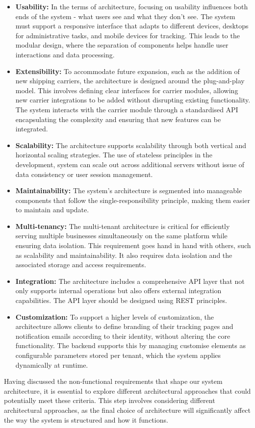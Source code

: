 \begin{itemize}
    \item \textbf{Usability:} In the terms of architecture, focusing on usability influences both ends of the system - what users see and what they don't see.
    The system must support a responsive interface that adapts to different devices, desktops for administrative tasks, and mobile devices for tracking.
    This leads to the modular design, where the separation of components helps handle user interactions and data processing.
    \item \textbf{Extensibility:} To accommodate future expansion, such as the addition of new shipping carriers, the architecture is designed around the plug-and-play model.
    This involves defining clear interfaces for carrier modules, allowing new carrier integrations to be added without disrupting existing functionality.
    The system interacts with the carrier module through a standardised API encapsulating the complexity and ensuring that new features can be integrated.
    \item \textbf{Scalability:} The architecture supports scalability through both vertical and horizontal scaling strategies.
    The use of stateless principles in the development, system can scale out across additional servers without issue of data consistency or user session management.
    \item \textbf{Maintainability:} The system's architecture is segmented into manageable components that follow the single-responsibility principle, making them easier to maintain and update.
    \item \textbf{Multi-tenancy:} The multi-tenant architecture is critical for efficiently serving multiple businesses simultaneously on the same platform while ensuring data isolation.
    This requirement goes hand in hand with others, such as scalability and maintainability. It also requires data isolation and the associated storage and access requirements.
    \item \textbf{Integration:} The architecture includes a comprehensive API layer that not only supports internal operations but also offers external integration capabilities.
    The API layer should be designed using REST principles.
    \item \textbf{Customization:} To support a higher levels of customization, the architecture allows clients to define branding of their tracking pages and notification emails according to their identity, without altering the core functionality.
    The backend supports this by managing customise elements as configurable parameters stored per tenant, which the system applies dynamically at runtime.
\end{itemize}
Having discussed the non-functional requirements that shape our system architecture, it is essential to explore different architectural approaches that could potentially meet these criteria.
This step involves considering different architectural approaches, as the final choice of architecture will significantly affect the way the system is structured and how it functions.

